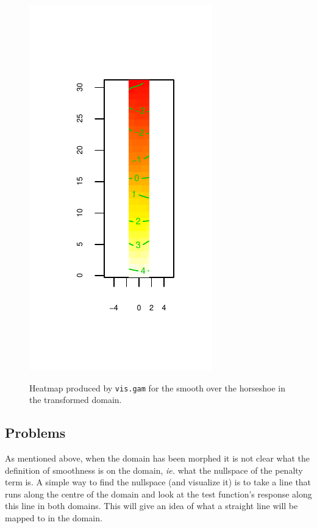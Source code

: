 \documentclass[a4paper,10pt]{amsart}
\begin{document}
\begin{figure}
\centering
\includegraphics[trim=0in 0.5in 0in 0.1in]{figs/hsvisgam.pdf} \\
\caption{Heatmap produced by \texttt{vis.gam} for the smooth over the horseshoe in the transformed domain.}
\label{hsvisgam}
\end{figure}

\subsection{Problems}

As mentioned above, when the domain has been morphed it is not clear what the definition of smoothness is on the domain, \emph{ie.} what the nullspace of the penalty term is. A simple way to find the nullspace (and visualize it) is to take a line that runs along the centre of the domain and look at the test function's response along this line in both domains. This will give an idea of what a straight line will be mapped to in the domain.
\end{document}
